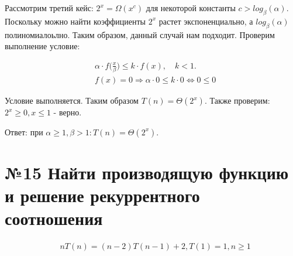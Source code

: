 \documentclass[a4paper,12pt,numbers=noenddot]{scrreprt}
\begin{document}
\begin{flushleft}
    Рассмотрим третий кейс: $2^x=\Omega(x^c)$ для некоторой константы $c>log_\beta(\alpha)$. Поскольку можно найти коэффициенты $2^x$ растет экспоненциально, а $log_\beta(\alpha)$ полиномиалоьлно. Таким образом, данный случай нам подходит. Проверим выполнение условие:
\end{flushleft}

\begin{align}
    & \alpha \cdot f \big(\frac{x}{\beta} \big) \leq k \cdot f(x), \quad k < 1. \\&
    f(x)=0 \Rightarrow \alpha \cdot 0 \leq k \cdot 0 \Leftrightarrow 0 \leq 0
\end{align}

\begin{flushleft}
    Условие выполняется. Таким образом $T(n)=\Theta(2^x)$. Также проверим: $2^x \geq 0, x \leq 1$ - верно.
\end{flushleft}

\begin{flushleft}
Ответ: при $\alpha \geq 1, \beta > 1: T(n)=\Theta(2^x)$.
\end{flushleft}

\section{№15 Найти производящую функцию и решение рекуррентного соотношения}

\begin{align}
    & nT(n)=(n-2)T(n-1)+2, T(1)=1, n \geq 1
\end{align}
\end{document}
